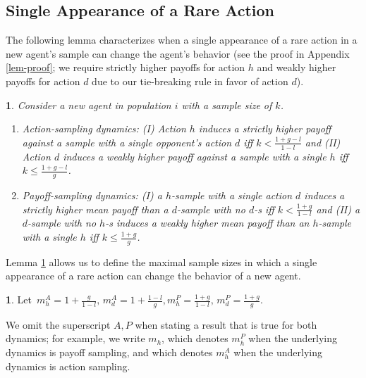 \documentclass[12pt]{article}
\numberwithin{equation}{section}
\numberwithin{figure}{section}
\theoremstyle{definition}
\newtheorem{defn}{\protect\definitionname}
\theoremstyle{plain}
\theoremstyle{plain}
\theoremstyle{plain}
\theoremstyle{remark}
\theoremstyle{plain}
\newtheorem{lem}{\protect\lemmaname}
\theoremstyle{plain}
\providecommand{\definitionname}{Definition}
\providecommand{\lemmaname}{Lemma}
\begin{document}
\subsection{Single Appearance of a Rare Action}
The following lemma characterizes when a single appearance of a rare action in a new agent's sample can change the agent's behavior (see the proof in Appendix \ref{lem-proof}; 
we require strictly higher payoffs for action $h$ and weakly higher payoffs for action $d$ due to our tie-breaking rule in favor of action $d$).

\begin{lem}
\label{lemma-sample} Consider a new agent in population $i$ with a sample size of $k$.
\begin{enumerate}
\item Action-sampling dynamics: (I) Action $h$ induces a 
strictly higher payoff
against a sample with a single opponent's action $d$ iff
$k<\frac{1+g-l}{1-l}$ 
and (II) Action $d$ induces a
weakly higher payoff against a sample
with a single $h$ iff $k\leq \frac{1+g-l}{g}$. 
\item Payoff-sampling dynamics: (I) a $h$-sample with a single action $d$
induces a
strictly higher mean payoff than a $d$-sample with no $d$-s
iff $k<\frac{1+g}{1-l}$ and (II) a $d$-sample with no $h$-s
induces a weakly higher mean payoff than an $h$-sample with a single
$h$ iff $k\leq \frac{1+g}{g}$. 
\end{enumerate}
\end{lem}

Lemma \ref{lemma-sample} allows us to define the maximal sample sizes in which a single appearance of a rare action can change the behavior of a new agent.


\begin{defn}\label{def:maximal-samples}
Let 
 $\,m_{h}^{A}= 1+\frac{g}{1-l} ,\,m_{d}^{A}= 1+\frac{1-l}{g},
 m_{h}^{P}= \frac{1+g}{1-l} ,\,m_{d}^{P}= \frac{1+g}{g}.$
 
\end{defn}
    We omit the superscript ${A,P}$ when stating a result that is true for both dynamics; for example, we write $m_h$, which denotes $m_h^P$ when the underlying dynamics is payoff sampling, and which denotes $m_h^A$ when the underlying dynamics is action sampling. 
    
\end{document}
